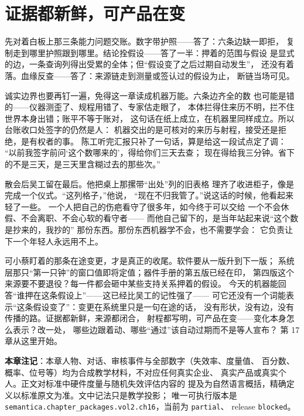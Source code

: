 \section{证据都新鲜，可产品在变}

先对着白板上那三条能力问题交账。数字带护照——答了：六条边缺一即拒，
复制走到哪里护照跟到哪里。结论拴假设——答了一半：押着的范围与假设
是显式的边，一条查询列得出受累的全体；但“假设变了之后过期自动发生”，
还没有着落。血缘反查——答了：来源链走到测量或签认过的假设为止，
断链当场可见。

诚实边界也要再钉一遍，免得这一章读成机器万能。六条边齐全的数
也可能是错的——仪器测歪了、规程用错了、专家估走眼了，
本体拦得住来历不明，拦不住世界本身出错；账平不等于账对，
这句话在纸上成立，在机器里同样成立。所以台账收口处签字的仍然是人：
机器交出的是可核对的来历与射程，接受还是拒绝，是有权者的事。
陈工听完汇报只补了一句话，算是给这一段试点定了调：
“以前我签字前问‘这个数哪来的’，得给你们三天去查；
现在得给我三分钟。省下的不是三天，是三天里含糊过去的那些次。”

散会后吴工留在最后。他把桌上那摞带“出处”列的旧表格
理齐了收进柜子，像是完成一个仪式。“这列格子，”他说，
“现在不归我管了。”说这话的时候，他看起来轻了一些。
一个人把自己的伤疤看守了很多年，如今终于可以交给
一个不会休假、不会离职、不会心软的看守者——
而他自己留下的，是当年站起来说“这个数是抄来的，我抄的”
那份东西。那份东西机器学不会，也不需要学会：
它负责让下一个年轻人永远用不上。

可小蔡盯着的那条在途变更，才是真正的收尾。软件要从一版升到下一版；
系统层那只“第一只钟”的窗口值即将定值；器件手册的第五版已经在印，
第四版这个来源要不要退役？每一件都会砸中某些支持关系押着的假设。
今天的机器能回答“谁押在这条假设上”——这已经比吴工的记性强了——
可它还没有一个词能表示“这条假设变了”：变更在系统里只是一句在途的话，
没有形状，没有边，没有传播的路。证据都新鲜，来源都闭合，
射程都写明，可产品在变——变化本身怎么表示？改一处，
哪些边跟着动、哪些“通过”该自动过期而不是等人宣布？
第 17 章从这里开始。


\begin{noteblock}
\textbf{本章注记}：本章人物、对话、审核事件与全部数字（失效率、度量值、
百分数、概率、位号等）均为合成教学材料，不对应任何真实企业、
真实产品或真实个人。正文对标准中硬件度量与随机失效评估内容的
提及为自然语言概括，精确定义以标准原文为准。文中记法只是教学投影；
唯一可执行版本是 \nolinkurl{semantica.chapter_packages.vol2.ch16}，当前为 \nolinkurl{partial}、
release \nolinkurl{blocked}。
\end{noteblock}
